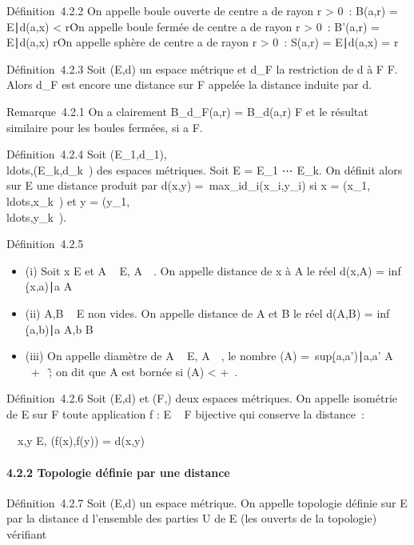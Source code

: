 \documentclass[]{article}
\begin{document}
Définition~4.2.2 On appelle boule ouverte de centre a de rayon r
> 0~: B(a,r) = \x \in
E∣d(a,x) < r\.

On appelle boule fermée de centre a de rayon r > 0~:
B'(a,r) = \x \in E∣d(a,x) \leq
r\.

On appelle sphère de centre a de rayon r > 0~: S(a,r) =
\x \in E∣d(a,x) =
r\

Définition~4.2.3 Soit (E,d) un espace métrique et d_F la
restriction de d à F \times F. Alors d_F est encore une distance sur
F appelée la distance induite par d.

Remarque~4.2.1 On a clairement B_d_F(a,r) =
B_d(a,r) \bigcap F et le résultat similaire pour les boules fermées,
si a \in F.

Définition~4.2.4 Soit
(E_1,d_1),\\ldots,(E_k,d_k~)
des espaces métriques. Soit E = E_1
\times⋯ \times E_k. On définit alors sur E une
distance produit par d(x,y) =\
max_id_i(x_i,y_i) si x =
(x_1,\\ldots,x_k~)
et y =
(y_1,\\ldots,y_k~).

Définition~4.2.5

\begin{itemize}
\itemsep1pt\parskip0pt
\item
  (i) Soit x \in E et A \subset~ E, A\neq~\varnothing~. On appelle
  distance de x à A le réel d(x,A) = inf~
  \d(x,a)∣a \in
  A\
\item
  (ii) A,B \subset~ E non vides. On appelle distance de A et B le réel d(A,B)
  = inf~
  \d(a,b)∣a \in A,b \in
  B\
\item
  (iii) On appelle diamètre de A \subset~ E, A\neq~\varnothing~, le
  nombre \delta(A) =\
  sup\d(a,a')∣a,a' \in
  A\ \in {}~ \cup\ + \infty~\~; on
  dit que A est bornée si \delta(A) < +\infty~.
\end{itemize}

Définition~4.2.6 Soit (E,d) et (F,\delta) deux espaces métriques. On appelle
isométrie de E sur F toute application f : E \rightarrow~ F bijective qui conserve
la distance~:

\forall~~x,y \in E, \delta(f(x),f(y)) = d(x,y)

\paragraph{4.2.2 Topologie définie par une distance}

Définition~4.2.7 Soit (E,d) un espace métrique. On appelle topologie
définie sur E par la distance d l'ensemble des parties U de E (les
ouverts de la topologie) vérifiant
\end{document}
